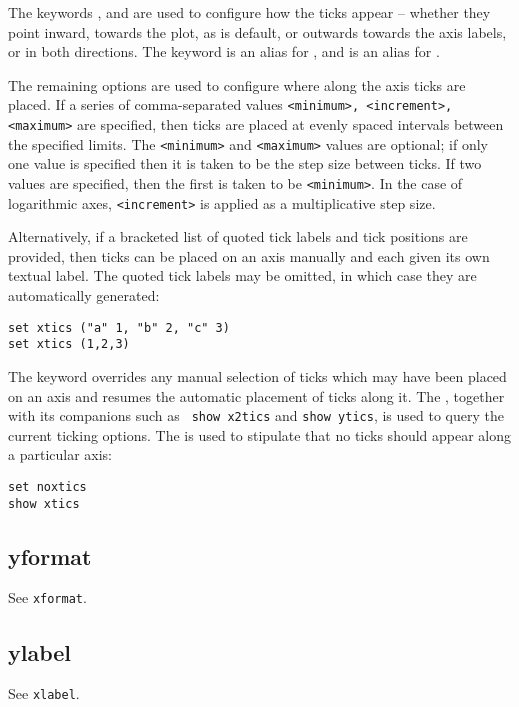 The keywords ,  and  are used to
configure how the ticks appear -- whether they point inward, towards the plot,
as is default, or outwards towards the axis labels, or in both directions.  The
keyword  is an alias for , and 
is an alias for .

The remaining options are used to configure where along the axis ticks are
placed. If a series of comma-separated values {\tt <minimum>, <increment>,
<maximum>} are specified, then ticks are placed at evenly spaced intervals
between the specified limits. The {\tt <minimum>} and {\tt <maximum>} values
are optional; if only one value is specified then it is taken to be the step
size between ticks. If two values are specified, then the first is taken to be
{\tt <minimum>}. In the case of logarithmic axes, {\tt <increment>} is applied
as a multiplicative step size.

Alternatively, if a bracketed list of quoted tick labels and tick positions are
provided, then ticks can be placed on an axis manually and each given its own
textual label. The quoted tick labels may be omitted, in which case they are
automatically generated:
\begin{verbatim}
set xtics ("a" 1, "b" 2, "c" 3)
set xtics (1,2,3)
\end{verbatim}
The keyword  overrides any manual selection of ticks which
may have been placed on an axis and resumes the automatic placement of ticks
along it. The , together with its companions such as {\tt
show x2tics} and {\tt show ytics}, is used to query the current ticking
options. The  is used to stipulate that no ticks should
appear along a particular axis:

\begin{verbatim}
set noxtics
show xtics
\end{verbatim}


\subsection{yformat}

See {\tt xformat}.


\subsection{ylabel}

See {\tt xlabel}.


